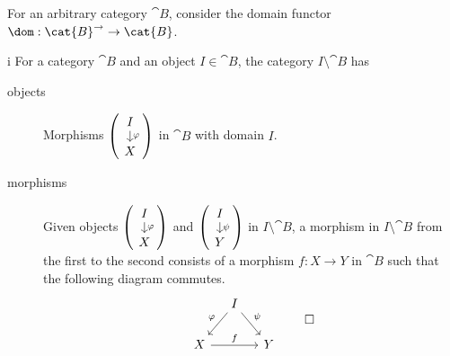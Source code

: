 \begin{exercise}
For an arbitrary category \(\cat{B}\), consider the domain functor \(\dom : \cat{B}^{\rightarrow} \to \cat{B}\).
\end{exercise}

\begin{partsolution}{i}
For a category \(\cat{B}\) and an object \(I \in \cat{B}\), the category \(I \setminus \cat{B}\) has
\begin{description}
\item[objects]
Morphisms \(\begin{pmatrix}\begin{tikzcd}[row sep=small] I \arrow[d, "\varphi"] \\ X\end{tikzcd}\end{pmatrix}\) in \(\cat{B}\) with domain \(I\).
\item[morphisms]
Given objects \(\begin{pmatrix}\begin{tikzcd}[row sep=small] I \arrow[d, "\varphi"] \\ X\end{tikzcd}\end{pmatrix}\) and \(\begin{pmatrix}\begin{tikzcd}[row sep=small] I \arrow[d, "\psi"] \\ Y\end{tikzcd}\end{pmatrix}\) in \(I \setminus \cat{B}\), a morphism in \(I \setminus \cat{B}\) from the first to the second consists of a morphism \(f : X \to Y\) in \(\cat{B}\) such that the following diagram commutes.
\begin{equation*}
\begin{tikzcd}[column sep=small]
& I \arrow[dl, "\varphi"{above left}] \arrow[dr, "\psi"] \\
X \arrow[rr, "f"] && Y
\end{tikzcd}
\qedhere
\end{equation*}
\end{description}
\end{partsolution}
